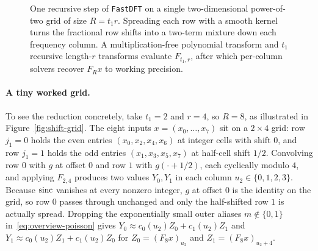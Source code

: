 \begin{figure}[t]
{%
}
\caption{One recursive step of \texttt{FastDFT} on a single two-dimensional power-of-two grid of size $R = t_1 r$. Spreading each row with a smooth kernel turns the fractional row shifts into a two-term mixture down each frequency column. A multiplication-free polynomial transform and $t_1$ recursive length-$r$ transforms evaluate $F_{t_1, r}$, after which per-column solvers recover $F_R x$ to working precision.}
\label{fig:pipeline}
\end{figure}

\paragraph{A tiny worked grid.}
To see the reduction concretely, take $t_1 = 2$ and $r = 4$, so $R = 8$, as illustrated in Figure~\ref{fig:shift-grid}. The eight inputs $x = (x_0, \dots, x_7)$ sit on a $2 \times 4$ grid: row $j_1 = 0$ holds the even entries $(x_0, x_2, x_4, x_6)$ at integer cells with shift $0$, and row $j_1 = 1$ holds the odd entries $(x_1, x_3, x_5, x_7)$ at half-cell shift $1/2$. Convolving row $0$ with $g$ at offset $0$ and row $1$ with $g(\cdot + 1/2)$, each cyclically modulo $4$, and applying $F_{2,4}$ produces two values $Y_0, Y_1$ in each column $u_2 \in \{0, 1, 2, 3\}$. Because $\operatorname{sinc}$ vanishes at every nonzero integer, $g$ at offset $0$ is the identity on the grid, so row $0$ passes through unchanged and only the half-shifted row $1$ is actually spread. Dropping the exponentially small outer aliases $m \notin \{0, 1\}$ in~\eqref{eq:overview-poisson} gives $Y_0 \approx c_0(u_2) Z_0 + c_1(u_2) Z_1$ and $Y_1 \approx c_0(u_2) Z_1 + c_1(u_2) Z_0$ for $Z_0 = (F_8 x)_{u_2}$ and $Z_1 = (F_8 x)_{u_2 + 4}$.

